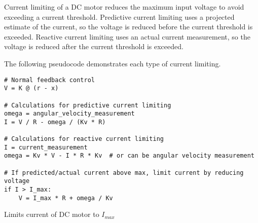 Current limiting of a DC motor reduces the maximum input voltage to avoid
exceeding a current threshold. Predictive current limiting uses a projected
estimate of the current, so the voltage is reduced before the current threshold
is exceeded. Reactive current limiting uses an actual current measurement, so
the voltage is reduced after the current threshold is exceeded.

The following pseudocode demonstrates each type of current limiting.
\begin{code}
  \begin{lstlisting}[style=customPython]
# Normal feedback control
V = K @ (r - x)

# Calculations for predictive current limiting
omega = angular_velocity_measurement
I = V / R - omega / (Kv * R)

# Calculations for reactive current limiting
I = current_measurement
omega = Kv * V - I * R * Kv  # or can be angular velocity measurement

# If predicted/actual current above max, limit current by reducing voltage
if I > I_max:
    V = I_max * R + omega / Kv
  \end{lstlisting}
  \caption{Limits current of DC motor to $I_{max}$}
\end{code}
